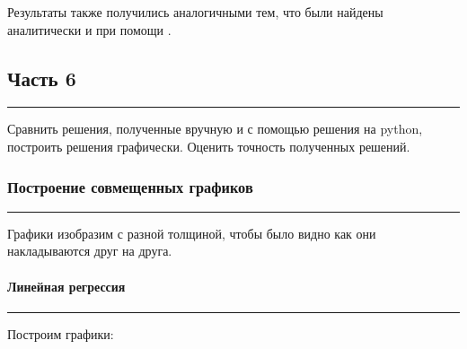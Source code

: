 \documentclass[a4paper, 14pt]{extarticle}
\begin{document}
Результаты также получились аналогичными тем, что были найдены аналитически и при помощи .

\subsection*{{Часть 6}}\vspace{-20pt}\rule{\linewidth}{0.1mm}

Сравнить решения, полученные вручную и с помощью решения на python, построить решения графически.  
Оценить точность полученных решений.

\subsubsection*{{Построение совмещенных графиков}}\vspace{-20pt}\rule{\linewidth}{0.1mm}

Графики изобразим с разной толщиной, чтобы было видно как они накладываются друг на друга.

\paragraph*{{Линейная регрессия}}\vspace{-20pt}\rule{\linewidth}{0.1mm}

Построим графики:
\end{document}

